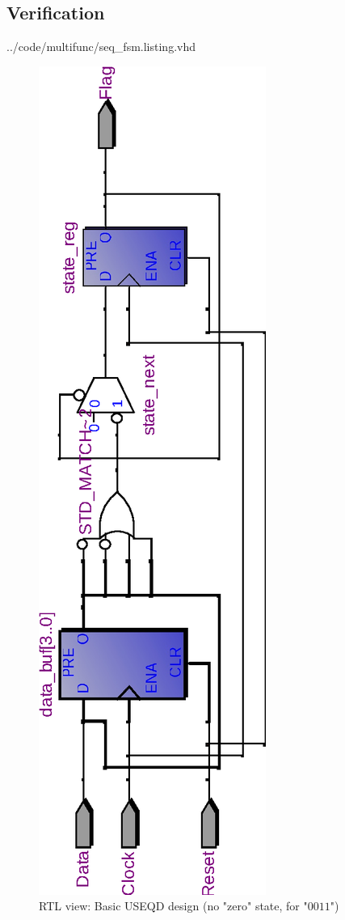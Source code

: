 \documentclass[10pt,a4paper]{report}
\begin{document}
\subsection{Verification}

\pagebreak

{../code/multifunc/seq_fsm.listing.vhd}

\begin{figure} \center

\includegraphics[scale=0.6,angle=-90]{graphs/seq_test1.rtl_BASIC4.eps}
\caption{\small{RTL view: Basic USEQD design (no "zero" state, for "$0011$")}} \label{rtl:usd:1b}


\end{figure}
\end{document}
